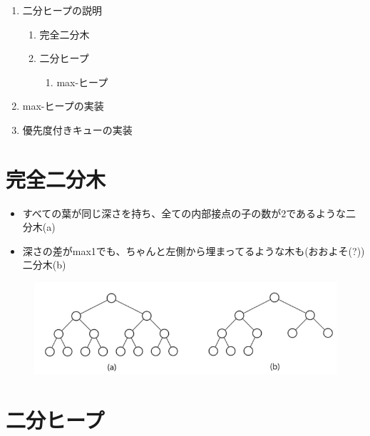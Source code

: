 \documentclass[11pt]{article}
\makeatletter
\def\maxwidth{\ifdim\Gin@nat@width>\linewidth\linewidth
    \else\Gin@nat@width\fi}
\let\Oldincludegraphics\includegraphics
\renewcommand{\includegraphics}[1]{\Oldincludegraphics[width=.8\maxwidth]{#1}}
\providecommand{\tightlist}{%
      \setlength{\itemsep}{0pt}\setlength{\parskip}{0pt}}
\makeatother
\begin{document}
\begin{enumerate}
\def\labelenumi{\arabic{enumi}.}
\tightlist
\item
  二分ヒープの説明

  \begin{enumerate}
  \def\labelenumii{\arabic{enumii}.}
  \tightlist
  \item
    完全二分木
  \item
    二分ヒープ

    \begin{enumerate}
    \def\labelenumiii{\arabic{enumiii}.}
    \tightlist
    \item
      max-ヒープ
    \end{enumerate}
  \end{enumerate}
\item
  max-ヒープの実装
\item
  優先度付きキューの実装
\end{enumerate}

    \section{完全二分木}\label{ux5b8cux5168ux4e8cux5206ux6728}

\begin{itemize}
\tightlist
\item
  すべての葉が同じ深さを持ち、全ての内部接点の子の数が2であるような二分木(a)
\item
  深さの差がmax1でも、ちゃんと左側から埋まってるような木も(おおよそ(?))二分木(b)
\end{itemize}

\begin{figure}
\centering
\includegraphics{./imgs/CBT.png}
\caption{}
\end{figure}

    \section{二分ヒープ}\label{ux4e8cux5206ux30d2ux30fcux30d7}
\end{document}
